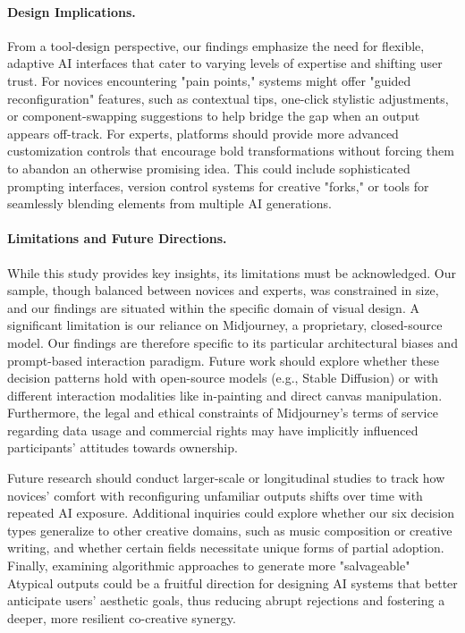 \documentclass[letterpaper]{article} %
\begin{document}
\paragraph{Design Implications.}
From a tool-design perspective, our findings emphasize the need for flexible, adaptive AI interfaces that cater to varying levels of expertise and shifting user trust. For novices encountering "pain points," systems might offer "guided reconfiguration" features, such as contextual tips, one-click stylistic adjustments, or component-swapping suggestions to help bridge the gap when an output appears off-track. For experts, platforms should provide more advanced customization controls that encourage bold transformations without forcing them to abandon an otherwise promising idea. This could include sophisticated prompting interfaces, version control systems for creative "forks," or tools for seamlessly blending elements from multiple AI generations.

\paragraph{Limitations and Future Directions.}
While this study provides key insights, its limitations must be acknowledged. Our sample, though balanced between novices and experts, was constrained in size, and our findings are situated within the specific domain of visual design. A significant limitation is our reliance on Midjourney, a proprietary, closed-source model. Our findings are therefore specific to its particular architectural biases and prompt-based interaction paradigm. Future work should explore whether these decision patterns hold with open-source models (e.g., Stable Diffusion) or with different interaction modalities like in-painting and direct canvas manipulation. Furthermore, the legal and ethical constraints of Midjourney’s terms of service regarding data usage and commercial rights may have implicitly influenced participants' attitudes towards ownership.

Future research should conduct larger-scale or longitudinal studies to track how novices’ comfort with reconfiguring unfamiliar outputs shifts over time with repeated AI exposure. Additional inquiries could explore whether our six decision types generalize to other creative domains, such as music composition or creative writing, and whether certain fields necessitate unique forms of partial adoption. Finally, examining algorithmic approaches to generate more "salvageable" Atypical outputs could be a fruitful direction for designing AI systems that better anticipate users’ aesthetic goals, thus reducing abrupt rejections and fostering a deeper, more resilient co-creative synergy.
\end{document}
